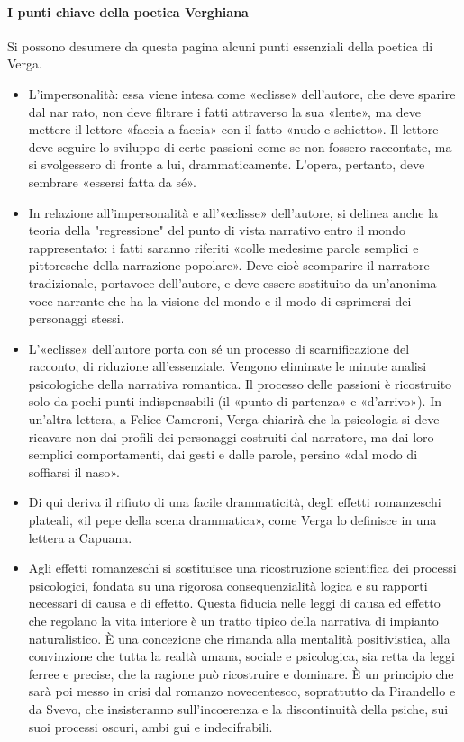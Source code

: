 \documentclass{book}
\begin{document}
\paragraph{I punti chiave della poetica Verghiana} Si possono desumere da questa pagina alcuni punti essenziali della poetica di Verga.
\begin{itemize}
\item L'impersonalità: essa viene intesa come «eclisse» dell'autore, che deve sparire dal nar rato, non deve filtrare i fatti attraverso la sua «lente», ma deve mettere il lettore «faccia a faccia» con il fatto «nudo e schietto». Il lettore deve seguire lo sviluppo di certe passioni come se non fossero raccontate, ma si svolgessero di fronte a lui, drammaticamente. L'opera, pertanto, deve sembrare «essersi fatta da sé».
\item In relazione all'impersonalità e all'«eclisse» dell'autore, si delinea anche la teoria della "regressione" del punto di vista narrativo entro il mondo rappresentato: i fatti saranno riferiti «colle medesime parole semplici e pittoresche della narrazione popolare». Deve cioè scomparire il narratore tradizionale, portavoce dell'autore, e deve essere sostituito da un'anonima voce narrante che ha la visione del mondo e il modo di esprimersi dei personaggi stessi.
\item L'«eclisse» dell'autore porta con sé un processo di scarnificazione del racconto, di riduzione all'essenziale. Vengono eliminate le minute analisi psicologiche della narrativa romantica. Il processo delle passioni è ricostruito solo da pochi punti indispensabili (il «punto di partenza» e «d'arrivo»). In un'altra lettera, a Felice Cameroni, Verga chiarirà che la psicologia si deve ricavare non dai profili dei personaggi costruiti dal narratore, ma dai loro semplici comportamenti, dai gesti e dalle parole, persino «dal modo di soffiarsi il naso».
\item Di qui deriva il rifiuto di una facile drammaticità, degli effetti romanzeschi plateali, «il pepe della scena drammatica», come Verga lo definisce in una lettera a Capuana.
\item Agli effetti romanzeschi si sostituisce una ricostruzione scientifica dei processi psicologici, fondata su una rigorosa consequenzialità logica e su rapporti necessari di causa e di effetto. Questa fiducia nelle leggi di causa ed effetto che regolano la vita interiore è un tratto tipico della narrativa di impianto naturalistico. È una concezione che rimanda alla mentalità positivistica, alla convinzione che tutta la realtà umana, sociale e psicologica, sia retta da leggi ferree e precise, che la ragione può ricostruire e dominare. È un principio che sarà poi messo in crisi dal romanzo novecentesco, soprattutto da Pirandello e da Svevo, che insisteranno sull’incoerenza e la discontinuità della psiche, sui suoi processi oscuri, ambi gui e indecifrabili.
\end{itemize}
\end{document}

